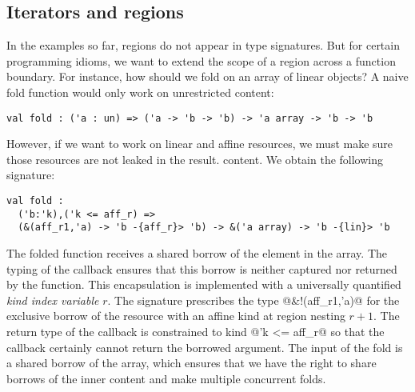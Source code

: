 

\subsection{Iterators and regions}
\label{tuto:vector}


In the examples so far, regions do not appear in type signatures.
But for certain programming idioms, we want to extend the scope of a
region across a function boundary.
For instance, how should we fold on an array of linear objects?
A naive fold function would only work on unrestricted content:
\begin{lstlisting}
val fold : ('a : un) => ('a -> 'b -> 'b) -> 'a array -> 'b -> 'b
\end{lstlisting}

However, if we want to work on linear and affine resources,
we must make sure those resources are not leaked in the result.
content. We obtain the following signature:

\begin{lstlisting}
val fold :
  ('b:'k),('k <= aff_r) =>
  (&(aff_r1,'a) -> 'b -{aff_r}> 'b) -> &('a array) -> 'b -{lin}> 'b
\end{lstlisting}

The folded function receives a shared borrow of the element in the array.
The typing of the callback ensures
that this borrow is neither captured nor returned by the function.
%
This encapsulation is implemented with a universally quantified \emph{kind index variable} $r$.
The signature prescribes the type @&!(aff_r1,'a)@ for the
exclusive borrow of the resource with an affine kind at region nesting $r+1$. The return
type of the callback is constrained to kind @'k <= aff_r@
so that the callback certainly cannot return the borrowed argument.
%
The input of the fold is a shared borrow of the array,
which ensures that we have the right to share borrows of the inner content and
make multiple concurrent folds.


